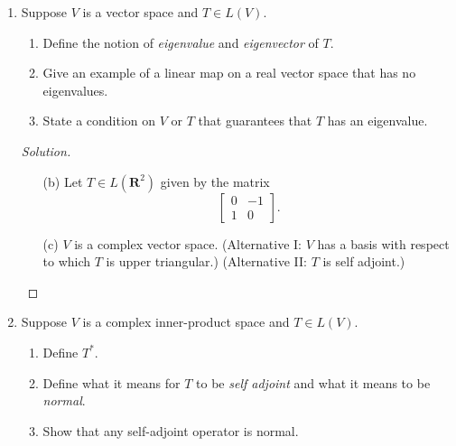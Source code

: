 \documentclass[12pt]{amsart}
\def\R{\mathbf{R}}
\begin{document}
\begin{enumerate}
\begin{proof}[Solution for {\rm (c)}]
Let $T \in L \left( \R^5 \right)$ given by the matrix
\[
  \left[ \begin{array}{ccccc}
    0 & 0 & 0 & 0 & 0 \\
    0 & 0 & 0 & 0 & 0 \\
    0 & 0 & 1 & 0 & 0 \\
    0 & 0 & 0 & 1 & 0 \\
    0 & 0 & 0 & 0 & 1
  \end{array} \right] . \qedhere
\]
\end{proof}

\item Suppose $V$ is a vector space and $T \in L(V)$.
  \begin{enumerate} 
  \item Define the notion of \emph{eigenvalue} and \emph{eigenvector} of $T$.
  \item Give an example of a linear map on a real vector space that has no eigenvalues.
  \item State a condition on $V$ or $T$ that guarantees that $T$ has an eigenvalue.
  \end{enumerate}

\begin{proof}[Solution]
\begin{enumerate}[(a)]

\item[(b)]
Let $T \in L \left( \R^2 \right)$ given by the matrix
\[
  \left[ \begin{array}{cc}
    0 & -1 \\
    1 & 0
  \end{array} \right] .
\]

\item[(c)]
$V$ is a complex vector space.
(Alternative I: $V$ has a basis with respect to which $T$ is upper triangular.)
(Alternative II: $T$ is self adjoint.) \qedhere

\end{enumerate}
\end{proof}

\newpage

\item Suppose $V$ is a complex inner-product space and $T \in L(V)$.
  \begin{enumerate} 
  \item Define $T^*$.
  \item Define what it means for $T$ to be \emph{self adjoint} and what it means to be \emph{normal}.
  \item Show that any self-adjoint operator is normal.
  \end{enumerate}

\end{enumerate}
\end{document}
